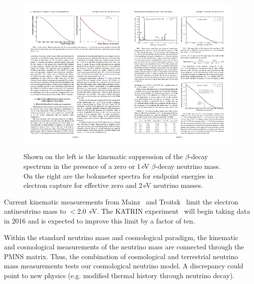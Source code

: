 \begin{figure}[h!]
\centering
\includegraphics[width=0.5\textwidth]{Neutrinos/BetaDecay}\includegraphics[width=0.5\textwidth]{Neutrinos/e-capture}
\caption{Shown on the left is the kinematic suppression of the
  $\beta$-decay spectrum in the presence of a zero or 1\,eV $\beta$-decay
  neutrino mass. On the right are the bolometer spectra for endpoint
  energies in electron capture for effective zero and 2\,eV neutrino
  masses.}
\label{fig:kinematic_mass}
\end{figure}

Current kinematic measurements from Mainz~\cite{Kraus:2004zw} and Troitsk~\cite{Aseev:2011dq} limit the electron antineutrino mass to $< 2.0$~eV. The KATRIN experiment~\cite{Angrik:2005ep} will begin taking data in 2016 and is expected to improve this limit by a factor of ten. 

Within the standard neutrino mass and cosmological paradigm, the kinematic and cosmological measurements of the neutrino mass are connected through the PMNS matrix. Thus, the combination of cosmological and terrestrial neutrino mass measurements tests our cosmological neutrino model. A discrepancy could point to new physics (e.g. modified thermal history through neutrino decay).

